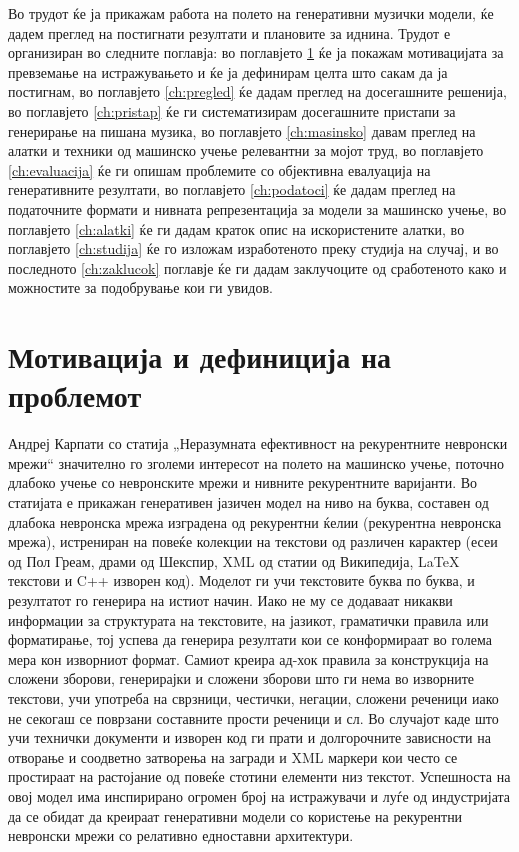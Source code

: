 Во трудот ќе ја прикажам работа на полето на генеративни музички модели, ќе дадем преглед на постигнати резултати и плановите за иднина. Трудот е организиран во следните поглавја: во поглавјето \ref{ch:motivacija} ќе ја покажам мотивацијата за превземање на истражувањето и ќе ја дефинирам целта што сакам да ја постигнам, во поглавјето \ref{ch:pregled} ќе дадам преглед на досегашните решенија, во поглавјето \ref{ch:pristap} ќе ги систематизирам досегашните пристапи за генерирање на пишана музика, во поглавјето \ref{ch:masinsko} давам преглед на алатки и техники од машинско учење релевантни за мојот труд, во поглавјето \ref{ch:evaluacija} ќе ги опишам проблемите со објективна евалуација на генеративните резултати, во поглавјето \ref{ch:podatoci} ќе дадам преглед на податочните формати и нивната репрезентација за модели за машинско учење, во поглавјето \ref{ch:alatki} ќе ги дадам краток опис на искористените алатки, во поглавјето \ref{ch:studija} ќе го изложам изработеното преку студија на случај, и во последното \ref{ch:zaklucok} поглавје ќе ги дадам заклучоците од сработеното како и можностите за подобрување кои ги увидов.

\chapter{Мотивација и дефиниција на проблемот}
\label{ch:motivacija}

Андреј Карпати со статија „Неразумната ефективност на рекурентните невронски мрежи“ \cite{AndrejKarpathy2015} значително го зголеми интересот на полето на машинско учење, поточно длабоко учење со невронските мрежи и нивните рекурентните варијанти. Во статијата е прикажан генеративен јазичен модел на ниво на буква, составен од длабока невронска мрежа изградена од рекурентни ќелии (рекурентна невронска мрежа), истрениран на повеќе колекции на текстови од различен карактер (есеи од Пол Греам, драми од Шекспир, XML од статии од Википедија, LaTeX текстови и C++ изворен код). Моделот ги учи текстовите буква по буква, и резултатот го генерира на истиот начин. Иако не му се додаваат никакви информации за структурата на текстовите, на јазикот, граматички правила или форматирање, тој успева да генерира резултати кои се конформираат во голема мера кон изворниот формат. Самиот креира ад-хок правила за конструкција на сложени зборови, генерирајки и сложени зборови што ги нема во изворните текстови, учи употреба на сврзници, честички, негации, сложени реченици иако не секогаш се поврзани составните прости реченици и сл. Во случајот каде што учи технички документи и изворен код ги прати и долгорочните зависности на отворање и соодветно затворења на загради и XML маркери кои често се простираат на растојание од повеќе стотини елементи низ текстот. Успешноста на овој модел има инспирирано огромен број на истражувачи и луѓе од индустријата да се обидат да креираат генеративни модели со користење на рекурентни невронски мрежи со релативно едноставни архитектури. 

